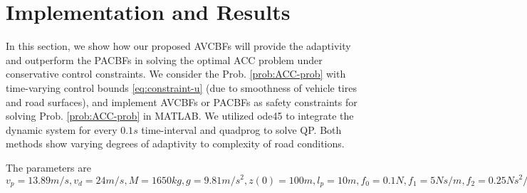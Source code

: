 \section{Implementation and Results}
\label{sec:Implementation}
In this section, we show how our proposed AVCBFs will provide the adaptivity and outperform the PACBFs in solving the optimal ACC problem under conservative control constraints. We consider the Prob. \ref{prob:ACC-prob} with time-varying control bounds \eqref{eq:constraint-u} (due to smoothness of vehicle tires and road surfaces), and implement AVCBFs or PACBFs as safety constraints for solving Prob. \ref{prob:ACC-prob} in MATLAB. We utilized ode45 to integrate the dynamic system for every $0.1s$ time-interval and quadprog to solve QP. Both methods show varying degrees of adaptivity to complexity of road conditions.

The parameters are $v_{p}=13.89m/s, v_{d}=24m/s, M=1650kg, g=9.81m/s^{2},z(0)=100m, l_{p}=10m, f_{0}=0.1N, f_{1}=5Ns/m, f_{2}=0.25Ns^{2}/m, c_{a}(t)=0.4.$
